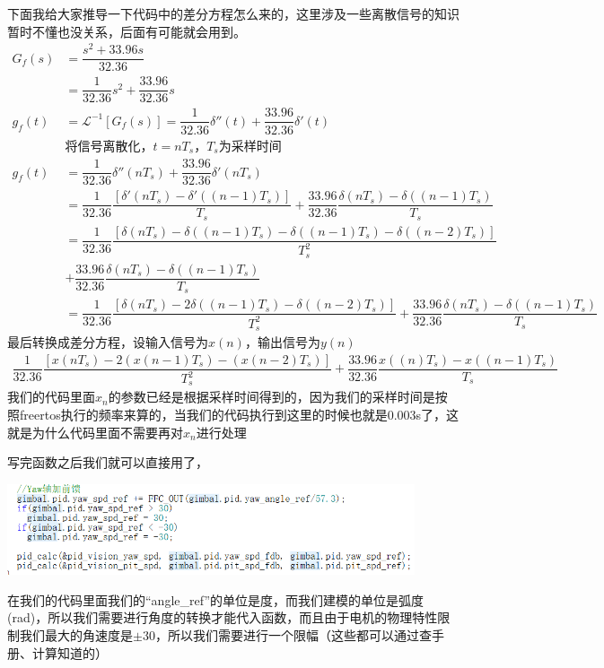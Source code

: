\documentclass[UTF8,a4paper,12pt]{ctexart}
\begin{document}
        下面我给大家推导一下代码中的差分方程怎么来的，这里涉及一些离散信号的知识暂时不懂也没关系，后面有可能就会用到。
        \begin{align*}
          G_f(s)&=\dfrac{s^2+33.96s}{32.36}\\
                &=\dfrac{1}{32.36}s^2+\dfrac{33.96}{32.36}s\\
            g_f(t)&=\mathcal{L}^{-1}{[G_f(s)]}=\dfrac{1}{32.36}\delta''\left( t \right)  + \dfrac{33.96}{32.36} \delta '\left( t \right)\\
            &\text{将信号离散化，$t=nT_s$，$T_s$为采样时间}\\
            g_f(t)&=\dfrac{1}{32.36}\delta''\left(nT_s \right)  + \dfrac{33.96}{32.36} \delta '\left(nT_s\right)\\
            &=\dfrac{1}{32.36}\dfrac{[\delta'(nT_s)-\delta'((n-1)T_s)]}{T_s} +  \dfrac{33.96}{32.36} \dfrac{\delta (nT_s)-\delta((n-1)T_s)}{T_s}\\
            &=\dfrac{1}{32.36}\dfrac{[\delta(nT_s)-\delta((n-1)T_s)-\delta((n-1)T_s)-\delta((n-2)T_s)]}{T_s^2} \\&+  \dfrac{33.96}{32.36} \dfrac{\delta (nT_s)-\delta((n-1)T_s)}{T_s}\\
            &=\dfrac{1}{32.36}\dfrac{[\delta(nT_s)-2\delta((n-1)T_s)-\delta((n-2)T_s)]}{T_s^2} +  \dfrac{33.96}{32.36} \dfrac{\delta (nT_s)-\delta((n-1)T_s)}{T_s}
        \end{align*}
        最后转换成差分方程，设输入信号为$x(n)$，输出信号为$y(n)$
        \begin{align*}
          \dfrac{1}{32.36}\dfrac{[x(nT_s)-2(x(n-1)T_s)-(x(n-2)T_s)]}{T_s^2} +  \dfrac{33.96}{32.36} \dfrac{x((n)T_s)-x((n-1)T_s)}{T_s}
        \end{align*} 
        我们的代码里面$x_n$的参数已经是根据采样时间得到的，因为我们的采样时间是按照freertos执行的频率来算的，当我们的代码执行到这里的时候也就是0.003s了，这就是为什么代码里面不需要再对$x_n$进行处理
        \begin{flushleft}
          写完函数之后我们就可以直接用了，
          \par \includegraphics[width=12cm]{picture/FFC_code.png}
        \end{flushleft}
        \begin{flushleft}
          在我们的代码里面我们的“angle\_ref”的单位是度，而我们建模的单位是弧度(rad)，所以我们需要进行角度的转换才能代入函数，而且由于电机的物理特性限制我们最大的角速度是$\pm 30$，所以我们需要进行一个限幅（这些都可以通过查手册、计算知道的）
        \end{flushleft}
\end{document}

